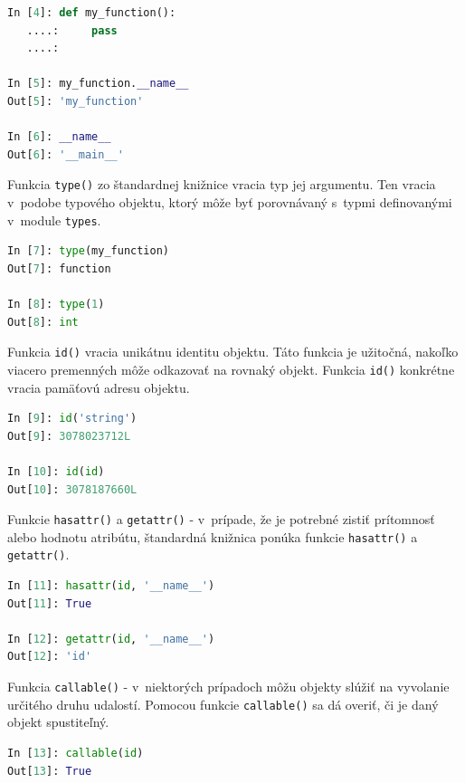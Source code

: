 \documentclass[11pt,oneside,final]{fithesis2}
\begin{document}
\begin{list}{•}{}
\begin{lstlisting}[language=python]		
In [4]: def my_function():
   ....:     pass
   ....: 

In [5]: my_function.__name__
Out[5]: 'my_function'

In [6]: __name__
Out[6]: '__main__'
\end{lstlisting}

		\item 
		
		Funkcia \texttt{type()} zo štandardnej knižnice vracia typ jej argumentu. Ten vracia v~podobe typového objektu, ktorý môže byť porovnávaný s~typmi definovanými v~module \texttt{types}.

\begin{lstlisting}[language=python]	
In [7]: type(my_function)
Out[7]: function

In [8]: type(1)
Out[8]: int
\end{lstlisting}


		\item 
		
		Funkcia \texttt{id()} vracia unikátnu identitu objektu. Táto funkcia je užitočná, nakoľko viacero premenných môže odkazovať na rovnaký objekt. Funkcia \texttt{id()} konkrétne vracia pamäťovú adresu objektu.

\begin{lstlisting}[language=python]	
In [9]: id('string')
Out[9]: 3078023712L

In [10]: id(id)
Out[10]: 3078187660L
\end{lstlisting}

		\item Funkcie \texttt{hasattr()} a \texttt{getattr()} -
		v~prípade, že je potrebné zistiť prítomnosť alebo hodnotu atribútu, štandardná knižnica ponúka funkcie \texttt{hasattr()} a \texttt{getattr()}.

\begin{lstlisting}[language=python]	
In [11]: hasattr(id, '__name__')
Out[11]: True

In [12]: getattr(id, '__name__')
Out[12]: 'id'
\end{lstlisting}		

		\item Funkcia \texttt{callable()} -
		v~niektorých prípadoch môžu objekty slúžiť na vyvolanie určitého druhu udalostí. Pomocou funkcie \texttt{callable()} sa dá overiť, či je daný objekt spustiteľný.

\begin{lstlisting}[language=python]	
In [13]: callable(id)
Out[13]: True


\end{lstlisting}
\end{list}
\end{document}
